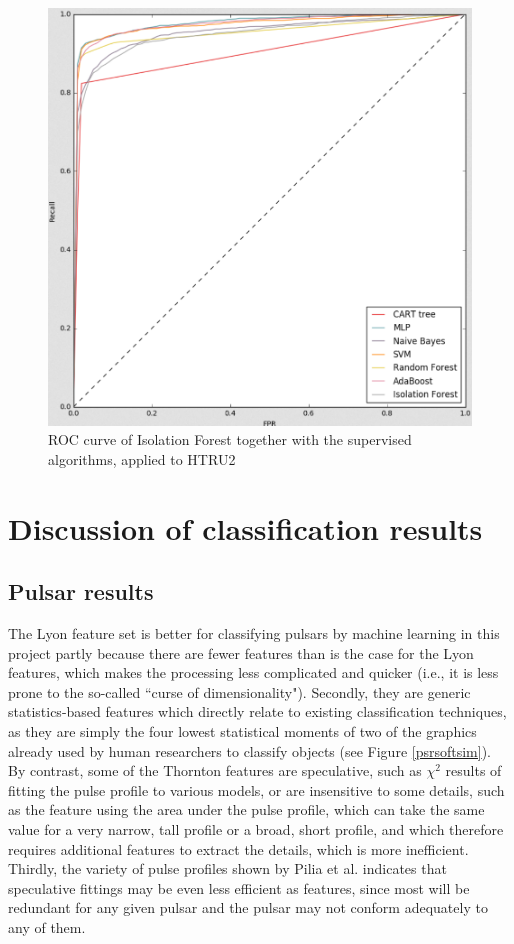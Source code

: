 \documentclass[12pt]{article}
\begin{document}
\begin{figure}[h!]
\begin{center}
\includegraphics[scale=0.4]{htru2_roc.png}
\caption{ROC curve of Isolation Forest together with the supervised algorithms, applied to HTRU2}
\label{HTRU2roc}
\end{center}
\end{figure}

\section{Discussion of classification results}
\subsection{Pulsar results}
The Lyon feature set is better for classifying pulsars by machine learning in this project partly because there are fewer features than is the case for the Lyon features, which makes the processing less complicated and quicker (i.e., it is less prone to the so-called ``curse of dimensionality"). Secondly, they are generic statistics-based features which directly relate to existing classification techniques, as they are simply the four lowest statistical moments of two of the graphics already used by human researchers to classify objects (see Figure \ref{psrsoftsim}). By contrast, some of the Thornton features are speculative, such as  $\chi^{2}$ results of fitting the pulse profile to various models, or are insensitive to some details, such as the feature using the area under the pulse profile, which can take the same value for a very narrow, tall profile or a broad, short profile, and which therefore requires additional features to extract the details, which is more inefficient. Thirdly, the variety of pulse profiles shown by Pilia et al. \cite{pilia2016wide} indicates that speculative fittings may be even less efficient as features, since most will be redundant for any given pulsar and the pulsar may not conform adequately to any of them.
\end{document}
